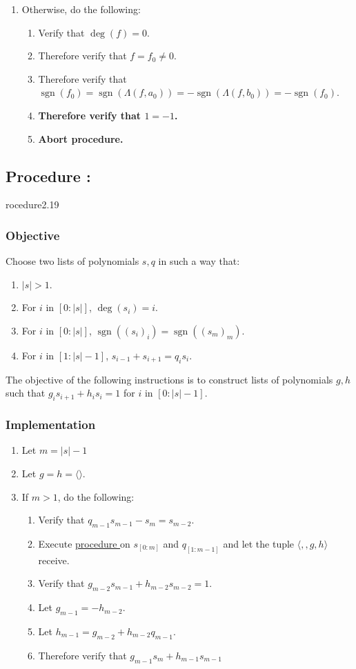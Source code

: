 \documentclass{article}
\DeclareMathOperator{\sgn}{sgn}
\newcounter{procedure}[part]
\newcommand{\procedure}[1]{\subsection*{Procedure \thepart:\theprocedure}\label{sec:procedure #1}\global\expandafter\edef\csname procedure#1\endcsname{\thepart:\theprocedure}\addtocounter{procedure}{1}}
\newcommand{\objective}{\subsubsection*{Objective}}
\newcommand{\implementation}{\subsubsection*{Implementation}}
\newcommand{\procedurehr}[1]{\hyperref[sec:procedure #1]{procedure \expandafter\csname procedure#1\endcsname}}
\begin{document}
\begin{multicols}{2}
\begin{enumerate}
\begin{enumerate}
					\end{enumerate}
					\item Otherwise, do the following:
					\begin{enumerate}
						\item Verify that $\deg(f)=0$.
						\item Therefore verify that $f=f_0\ne 0$.
						\item Therefore verify that $\sgn(f_0)=\sgn(\Lambda(f,a_0))=-\sgn(\Lambda(f,b_0))=-\sgn(f_0)$.
						\item \textbf{Therefore verify that $1=-1$.}
						\item \textbf{Abort procedure.}
					\end{enumerate}
				\end{enumerate}
		\procedure{2.19}
			\objective
				Choose two lists of polynomials $s,q$ in such a way that:
				\begin{enumerate}
					\item $\lvert s\rvert>1$.
					\item For $i$ in $[0:\lvert s\rvert]$, $\deg(s_i)=i$.
					\item For $i$ in $[0:\lvert s\rvert]$, $\sgn((s_i)_i)=\sgn((s_m)_m)$.
					\item For $i$ in $[1:\lvert s\rvert-1]$, $s_{i-1}+s_{i+1}=q_is_i$.
				\end{enumerate}
				The objective of the following instructions is to construct lists of polynomials $g,h$ such that $g_is_{i+1}+h_is_i=1$ for $i$ in $[0:\lvert s\rvert-1]$.
			\implementation
				\begin{enumerate}
					\item Let $m=\lvert s\rvert-1$
					\item Let $g=h=\langle\rangle$.
					\item If $m>1$, do the following:
					\begin{enumerate}
						\item Verify that $q_{m-1}s_{m-1}-s_{m}=s_{m-2}$.
						\item Execute \procedurehr{2.19} on $s_{[0:m]}$ and $q_{[1:m-1]}$ and let the tuple $\langle,,g,h\rangle$ receive.
						\item Verify that $g_{m-2}s_{m-1}+h_{m-2}s_{m-2}=1$.
						\item Let $g_{m-1}=-h_{m-2}$.
						\item Let $h_{m-1}=g_{m-2}+h_{m-2}q_{m-1}$.
						\item Therefore verify that $g_{m-1}s_{m}+h_{m-1}s_{m-1}$
						\begin{enumerate}

\end{enumerate}
\end{enumerate}
\end{enumerate}
\end{multicols}
\end{document}
